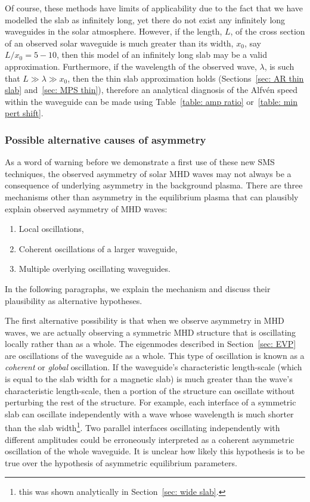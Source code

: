 \documentclass[12pt]{../style-files/ociamthesis}
\begin{document}
Of course, these methods have limits of applicability due to the fact that we have modelled the slab as infinitely long, yet there do not exist any infinitely long waveguides in the solar atmosphere. However, if the length, $L$, of the cross section of an observed solar waveguide is much greater than its width, $x_0$, say $L/x_0 = 5-10$, then this model of an infinitely long slab may be a valid approximation. Furthermore, if the wavelength of the observed wave, $\lambda$, is such that $L \gg \lambda \gg x_0$, then the thin slab approximation holds (Sections~\ref{sec: AR thin slab} and~\ref{sec: MPS thin}), therefore an analytical diagnosis of the Alfv\'{e}n speed within the waveguide can be made using Table~\ref{table: amp ratio} or~\ref{table: min pert shift}.


\subsubsection{Possible alternative causes of asymmetry}

As a word of warning before we demonstrate a first use of these new SMS techniques, the observed asymmetry of solar MHD waves may not always be a consequence of underlying asymmetry in the background plasma. There are three mechanisms other than asymmetry in the equilibrium plasma that can plausibly explain observed asymmetry of MHD waves:
\begin{enumerate}
	\item Local oscillations,
	\item Coherent oscillations of a larger waveguide,
	\item Multiple overlying oscillating waveguides.
\end{enumerate}
In the following paragraphs, we explain the mechanism and discuss their plausibility as alternative hypotheses.

The first alternative possibility is that when we observe asymmetry in MHD waves, we are actually observing a symmetric MHD structure that is oscillating locally rather than as a whole. The eigenmodes described in Section~\ref{sec: EVP} are oscillations of the waveguide as a whole. This type of oscillation is known as a \textit{coherent} or \textit{global} oscillation. If the waveguide's characteristic length-scale (which is equal to the slab width for a magnetic slab) is much greater than the wave's characteristic length-scale, then a portion of the structure can oscillate without perturbing the rest of the structure. For example, each interface of a symmetric slab can oscillate independently with a wave whose wavelength is much shorter than the slab width\footnote{this was shown analytically in Section~\ref{sec: wide slab}.}. Two parallel interfaces oscillating independently with different amplitudes could be erroneously interpreted as a coherent asymmetric oscillation of the whole waveguide. It is unclear how likely this hypothesis is to be true over the hypothesis of asymmetric equilibrium parameters.
\end{document}
